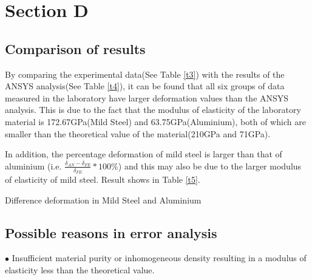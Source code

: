 \section*{Section D}
\label{sec:Section D}
\FloatBarrier %


\subsection*{Comparison of results}

By comparing the experimental data(See Table \ref{t3}) with the results of the ANSYS analysis(See Table \ref{t4}), 
it can be found that all six groups of data measured in the laboratory have 
larger deformation values than the ANSYS analysis. This is due to the fact 
that the modulus of elasticity of the laboratory material is 172.67GPa(Mild Steel) and 63.75GPa(Aluminium), 
both of which are smaller than the theoretical value of the material(210GPa and 71GPa).


In addition, the percentage deformation of mild steel is larger than 
that of aluminium 
(i.e. $\frac{\delta_{AN}-\delta_{FE}}{\delta_{FE}}*100\%$)
and this may also be due to the larger modulus of elasticity of mild steel.
Result shows in Table \ref{t5}.

\begin{minipage}[htbp]{\textwidth}
    \makeatletter{}
    \centering

    \caption{Difference deformation in Mild Steel and Aluminium}
    \label{t5} 
\end{minipage}






\subsection*{Possible reasons in error analysis}
$\bullet$ Insufficient material purity or inhomogeneous density 
resulting in a modulus of elasticity less than the theoretical value.


